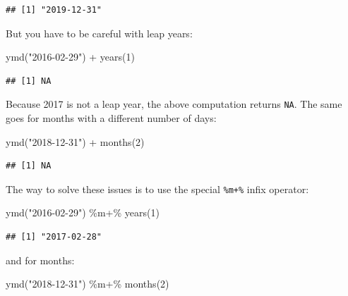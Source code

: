 \documentclass[
]{article}
\newenvironment{Shaded}{\begin{snugshade}}{\end{snugshade}}
\newcommand{\DecValTok}[1]{\textcolor[rgb]{0.00,0.00,0.81}{#1}}
\newcommand{\FunctionTok}[1]{\textcolor[rgb]{0.00,0.00,0.00}{#1}}
\newcommand{\NormalTok}[1]{#1}
\newcommand{\SpecialCharTok}[1]{\textcolor[rgb]{0.00,0.00,0.00}{#1}}
\newcommand{\StringTok}[1]{\textcolor[rgb]{0.31,0.60,0.02}{#1}}
\begin{document}
\begin{verbatim}
## [1] "2019-12-31"
\end{verbatim}

But you have to be careful with leap years:

\begin{Shaded}
\begin{Highlighting}[]
\FunctionTok{ymd}\NormalTok{(}\StringTok{"2016{-}02{-}29"}\NormalTok{) }\SpecialCharTok{+} \FunctionTok{years}\NormalTok{(}\DecValTok{1}\NormalTok{)}
\end{Highlighting}
\end{Shaded}

\begin{verbatim}
## [1] NA
\end{verbatim}

Because 2017 is not a leap year, the above computation returns \texttt{NA}. The same goes for months with
a different number of days:

\begin{Shaded}
\begin{Highlighting}[]
\FunctionTok{ymd}\NormalTok{(}\StringTok{"2018{-}12{-}31"}\NormalTok{) }\SpecialCharTok{+} \FunctionTok{months}\NormalTok{(}\DecValTok{2}\NormalTok{)}
\end{Highlighting}
\end{Shaded}

\begin{verbatim}
## [1] NA
\end{verbatim}

The way to solve these issues is to use the special \texttt{\%m+\%} infix operator:

\begin{Shaded}
\begin{Highlighting}[]
\FunctionTok{ymd}\NormalTok{(}\StringTok{"2016{-}02{-}29"}\NormalTok{) }\SpecialCharTok{\%m+\%} \FunctionTok{years}\NormalTok{(}\DecValTok{1}\NormalTok{)}
\end{Highlighting}
\end{Shaded}

\begin{verbatim}
## [1] "2017-02-28"
\end{verbatim}

and for months:

\begin{Shaded}
\begin{Highlighting}[]
\FunctionTok{ymd}\NormalTok{(}\StringTok{"2018{-}12{-}31"}\NormalTok{) }\SpecialCharTok{\%m+\%} \FunctionTok{months}\NormalTok{(}\DecValTok{2}\NormalTok{)}
\end{Highlighting}
\end{Shaded}
\end{document}
